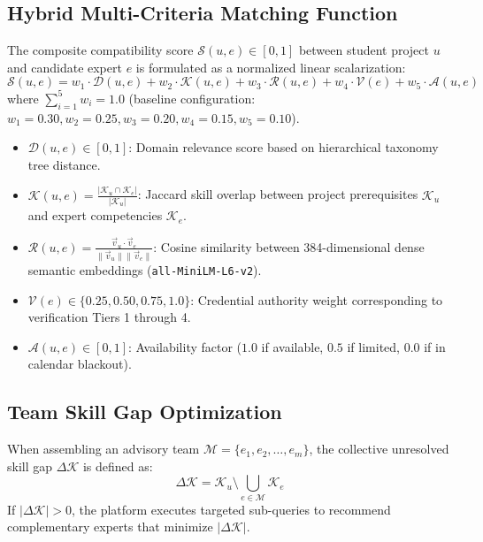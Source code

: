\documentclass[11pt,a4paper]{article}
\begin{document}
\subsection{Hybrid Multi-Criteria Matching Function}
The composite compatibility score $\mathcal{S}(u, e) \in [0, 1]$ between student project $u$ and candidate expert $e$ is formulated as a normalized linear scalarization:
\begin{equation}
    \label{eq:hybrid_matching}
    \mathcal{S}(u, e) = w_1 \cdot \mathcal{D}(u, e) + w_2 \cdot \mathcal{K}(u, e) + w_3 \cdot \mathcal{R}(u, e) + w_4 \cdot \mathcal{V}(e) + w_5 \cdot \mathcal{A}(u, e)
\end{equation}
where $\sum_{i=1}^5 w_i = 1.0$ (baseline configuration: $w_1=0.30, w_2=0.25, w_3=0.20, w_4=0.15, w_5=0.10$).
\begin{itemize}[noitemsep]
    \item $\mathcal{D}(u, e) \in [0, 1]$: Domain relevance score based on hierarchical taxonomy tree distance.
    \item $\mathcal{K}(u, e) = \frac{|\mathcal{K}_u \cap \mathcal{K}_e|}{|\mathcal{K}_u|}$: Jaccard skill overlap between project prerequisites $\mathcal{K}_u$ and expert competencies $\mathcal{K}_e$.
    \item $\mathcal{R}(u, e) = \frac{\vec{v}_u \cdot \vec{v}_e}{\|\vec{v}_u\| \|\vec{v}_e\|}$: Cosine similarity between 384-dimensional dense semantic embeddings (\texttt{all-MiniLM-L6-v2}).
    \item $\mathcal{V}(e) \in \{0.25, 0.50, 0.75, 1.0\}$: Credential authority weight corresponding to verification Tiers 1 through 4.
    \item $\mathcal{A}(u, e) \in [0, 1]$: Availability factor ($1.0$ if available, $0.5$ if limited, $0.0$ if in calendar blackout).
\end{itemize}

\subsection{Team Skill Gap Optimization}
When assembling an advisory team $\mathcal{M} = \{e_1, e_2, \dots, e_m\}$, the collective unresolved skill gap $\Delta \mathcal{K}$ is defined as:
\begin{equation}
    \label{eq:skill_gap}
    \Delta \mathcal{K} = \mathcal{K}_u \setminus \bigcup_{e \in \mathcal{M}} \mathcal{K}_e
\end{equation}
If $|\Delta \mathcal{K}| > 0$, the platform executes targeted sub-queries to recommend complementary experts that minimize $|\Delta \mathcal{K}|$.
\end{document}
